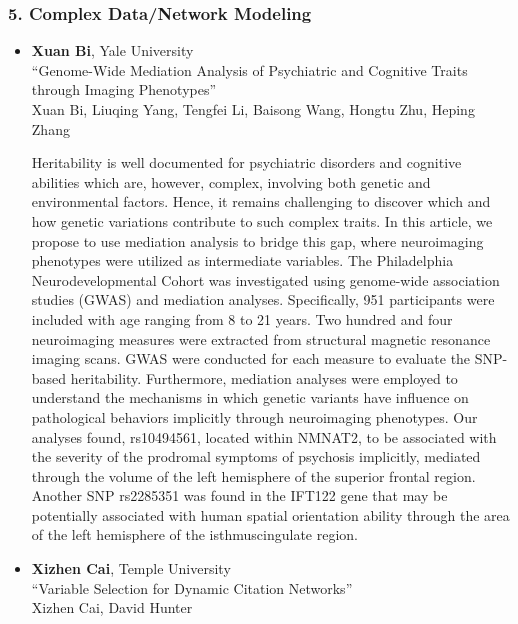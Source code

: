 \subsubsection*{5. Complex Data/Network Modeling}

\begin{itemize}
\item \textbf{Xuan Bi}, Yale University \\
``Genome-Wide Mediation Analysis of Psychiatric and Cognitive Traits through Imaging Phenotypes'' \\
Xuan Bi, Liuqing Yang, Tengfei Li, Baisong Wang, Hongtu Zhu, Heping Zhang


Heritability is well documented for psychiatric disorders and cognitive abilities which are, however, complex, involving both genetic and environmental factors. Hence, it remains challenging to discover which and how genetic variations contribute to such complex traits. In this article, we propose to use mediation analysis to bridge this gap, where neuroimaging phenotypes were utilized as intermediate variables. The Philadelphia Neurodevelopmental Cohort was investigated using genome-wide association studies (GWAS) and mediation analyses. Specifically, 951 participants were included with age ranging from 8 to 21 years. Two hundred and four neuroimaging measures were extracted from structural magnetic resonance imaging scans. GWAS were conducted for each measure to evaluate the SNP-based heritability. Furthermore, mediation analyses were employed to understand the mechanisms in which genetic variants have influence on pathological behaviors implicitly through neuroimaging phenotypes. Our analyses found, rs10494561, located within NMNAT2, to be associated with the severity of the prodromal symptoms of psychosis implicitly, mediated through the volume of the left hemisphere of the superior frontal region. Another SNP rs2285351 was found in the IFT122 gene that may be potentially associated with human spatial orientation ability through the area of the left hemisphere of the isthmuscingulate region.

\item \textbf{Xizhen Cai}, Temple University \\
``Variable Selection for Dynamic Citation Networks'' \\
Xizhen Cai, David Hunter



\end{itemize}
